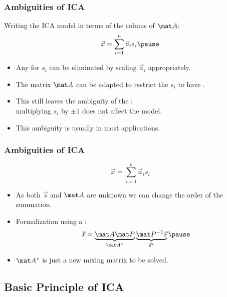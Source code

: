 \begin{frame}
  \frametitle{Ambiguities of ICA}

  Writing the ICA model in terms of the colums of $\mat A$:
  \begin{displaymath}
    \vec x = \sum_{i=1}^n \vec a_i s_i \pause
  \end{displaymath}
  
  \begin{itemize}
    \item Any  for $s_i$ can be eliminated by scaling $\vec a_i$ appropriately. \pause
    \item The matrix $\mat A$ can be adapted to restrict the $s_i$ to have . \pause
    \item This still leaves the ambiguity of the : \\
      multiplying $s_i$ by $\pm 1$ does not affect the model. \pause
    \item This ambiguity is usually  in most applications.
  \end{itemize}
\end{frame}


\begin{frame}
  \frametitle{Ambiguities of ICA \cont}

  \begin{displaymath}
    \vec x = \sum_{i=1}^n \vec a_i s_i
  \end{displaymath}
  \pspread
  
  \begin{itemize}
    \item As both $\vec s$ and $\mat A$ are unknown we can change the order of the summation. \pause
    \item Formalization using a :
      \begin{displaymath}
        \vec x = \underbrace{\mat A \mat P}_{\mat A^{\ast}} \underbrace{\mat P^{-1} \vec s}_{\vec s^{\ast}} \pause
      \end{displaymath}
    \item $\mat A^{\ast}$ is just a new mixing matrix to be solved.
  \end{itemize}
\end{frame}


\subsection{Basic Principle of ICA}

